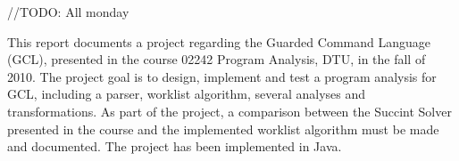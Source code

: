 //TODO: All monday

This report documents a project regarding the
Guarded Command Language (GCL), presented in the course 02242
Program Analysis, DTU, in the fall of 2010.
The project goal is to design, implement and test
a program analysis for GCL, including a parser,
worklist algorithm, several analyses and transformations.
As part of the project, a comparison between the Succint Solver
presented in the course and the implemented worklist algorithm
must be made and documented.
The project has been implemented in Java.


